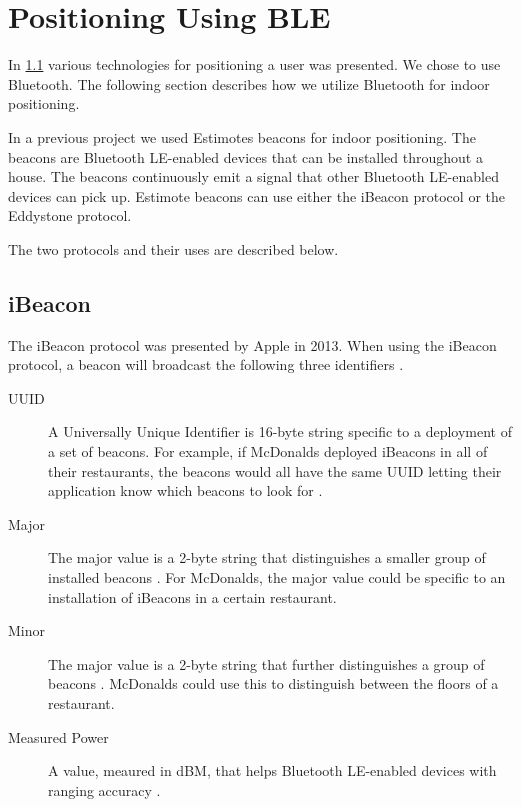 \section{Positioning Using BLE}
\label{sec:design:ble-positioning}

In \cref{} various technologies for positioning a user was presented. We chose to use Bluetooth. The following section describes how we utilize Bluetooth for indoor positioning.

In a previous project \cite{prespecialisation} we used Estimotes beacons for indoor positioning. The beacons are Bluetooth LE-enabled devices that can be installed throughout a house. The beacons continuously emit a signal that other Bluetooth LE-enabled devices can pick up.
Estimote beacons can use either the iBeacon protocol or the Eddystone protocol.

The two protocols and their uses are described below.

\subsection{iBeacon}

The iBeacon protocol was presented by Apple in 2013. When using the iBeacon protocol, a beacon will broadcast the following three identifiers \cite[ch. 1]{gilchrist2014learning}.

\begin{description}
\item[UUID] A Universally Unique Identifier is 16-byte string \cite{estimote:what-is-ibeacon} specific to a deployment of a set of beacons. For example, if McDonalds deployed iBeacons in all of their restaurants, the beacons would all have the same UUID letting their application know which beacons to look for \cite[ch. 1]{gilchrist2014learning}.
\item[Major] The major value is a 2-byte string \cite{estimote:what-is-ibeacon} that distinguishes a smaller group of installed beacons \cite[ch. 1]{gilchrist2014learning}. For McDonalds, the major value could be specific to an installation of iBeacons in a certain restaurant.
\item[Minor] The major value is a 2-byte string \cite{estimote:what-is-ibeacon} that further distinguishes a group of beacons \cite[ch. 1]{gilchrist2014learning}. McDonalds could use this to distinguish between the floors of a restaurant.
\item[Measured Power] A value, meaured in dBM, that helps Bluetooth LE-enabled devices with ranging accuracy \cite{apple:proximity-beacon-spec}.
\end{description}

